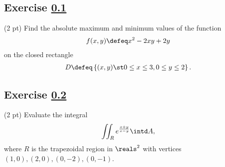 


\subsection{Exercise \ref{sec: Vector Calculus Q2}}
\label{sec: Vector Calculus Q2}

(2 pt) Find the absolute maximum and minimum values of the function
\begin{align*}
f(x,y)
\defeq
x^{2} - 2 x y + 2 y
\end{align*}
on the closed rectangle
\begin{align*}
D
\defeq
\left\{(x,y) \st 0 \leq x \leq 3,0 \leq y \leq 2\right\}.
\end{align*}

\vspace{3in}



\subsection{Exercise \ref{sec: Vector Calculus Q3}}
\label{sec: Vector Calculus Q3}

(2 pt) Evaluate the integral
\begin{align*}
\iint_{R} e^{\frac{x + y}{x - y}} \intd A,
\end{align*}
where $R$ is the trapezoidal region in $\reals^{2}$ with vertices $(1,0),(2,0),(0,-2),(0,-1)$.

